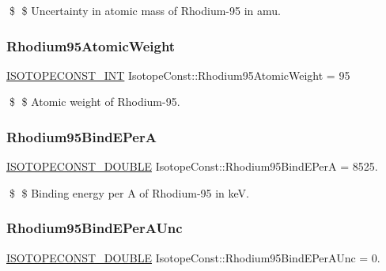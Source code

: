 \$ \$ Uncertainty in atomic mass of Rhodium-\/95 in amu. \mbox{\label{group___isotope_const-_rhodium-_rh95_gafac4484aeac81c070d1ad9bf59aea9c8}} 
\subsubsection{\texorpdfstring{Rhodium95\+Atomic\+Weight}{Rhodium95AtomicWeight}}
{\footnotesize\ttfamily \mbox{\hyperlink{group___isotope_const-_macros_ga5f18360b3e99483a35c32d789e62621c}{I\+S\+O\+T\+O\+P\+E\+C\+O\+N\+S\+T\+\_\+\+I\+NT}} Isotope\+Const\+::\+Rhodium95\+Atomic\+Weight = 95}

\$ \$ Atomic weight of Rhodium-\/95. \mbox{\label{group___isotope_const-_rhodium-_rh95_ga6a8009996ff301e01da0c40be4e093ff}} 
\subsubsection{\texorpdfstring{Rhodium95\+Bind\+E\+PerA}{Rhodium95BindEPerA}}
{\footnotesize\ttfamily \mbox{\hyperlink{group___isotope_const-_macros_ga8f45a7272ce02c0b4c65c44636ed719a}{I\+S\+O\+T\+O\+P\+E\+C\+O\+N\+S\+T\+\_\+\+D\+O\+U\+B\+LE}} Isotope\+Const\+::\+Rhodium95\+Bind\+E\+PerA = 8525.}

\$ \$ Binding energy per A of Rhodium-\/95 in keV. \mbox{\label{group___isotope_const-_rhodium-_rh95_ga7370238c878bdbc61008b75f353904e2}} 
\subsubsection{\texorpdfstring{Rhodium95\+Bind\+E\+Per\+A\+Unc}{Rhodium95BindEPerAUnc}}
{\footnotesize\ttfamily \mbox{\hyperlink{group___isotope_const-_macros_ga8f45a7272ce02c0b4c65c44636ed719a}{I\+S\+O\+T\+O\+P\+E\+C\+O\+N\+S\+T\+\_\+\+D\+O\+U\+B\+LE}} Isotope\+Const\+::\+Rhodium95\+Bind\+E\+Per\+A\+Unc = 0.}

